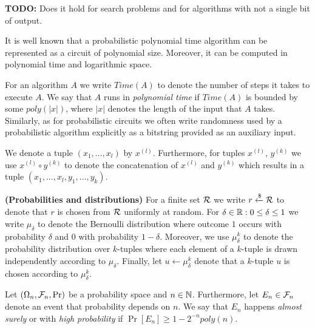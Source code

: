 \begin{todo}
  \textbf{TODO:} Does it hold for search problems and for algorithms with not a single bit of output.
\end{todo}
It is well known \cite{Arora:2009:CCM:1540612} that a probabilistic polynomial time algorithm can be represented as a circuit of polynomial size.
Moreover, it can be computed in polynomial time and logarithmic space.

For an algorithm $A$ we write $\mathit{Time}(A)$ to denote the number of steps it takes to execute $A$.
We say that $A$ runs in \textit{polynomial time} if $\mathit{Time}(A)$ is bounded by some $poly(|x|)$, where $|x|$ denotes the length of the input that $A$ takes.
Similarly, as for probabilistic circuits we often write randomness used by a probabilistic algorithm explicitly as a bitstring provided as an auxiliary input.

We denote a tuple $(x_1, \dotsc, x_l)$ by $x^{(l)}$.
Furthermore, for tuples $x^{(l)}$, $y^{(k)}$ we use $x^{(l)} \circ y^{(k)}$ to denote the concatenation of $x^{(l)}$ and $y^{(k)}$ which results in
a tuple $(x_1, \dotsc, x_l, y_1, \dotsc, y_k)$.

\textbf{(Probabilities and distributions)}
For a finite set $\mathcal{R}$ we write $r \xleftarrow{\$} \mathcal{R}$ to denote that $r$ is chosen from $\mathcal{R}$ uniformly at random.
For $\delta \in \mathbb{R} : 0 \leq \delta \leq 1$ we write $\mu_{\delta}$ to denote the Bernoulli distribution where outcome $1$ occurs with
probability $\delta$ and $0$ with probability $1-\delta$.
Moreover, we use $\mu_{\delta}^k$ to denote the probability distribution over $k$-tuples
where each element of a $k$-tuple is drawn independently according to $\mu_{\delta}$.
Finally, let $u \leftarrow \mu_{\delta}^k$ denote that a $k$-tuple $u$ is chosen according to $\mu_{\delta}^k$.

Let $(\Omega_n, \mathcal{F}_n, \Pr)$ be a probability space and $n \in \mathbb{N}$.
Furthermore, let $E_n \in \mathcal{F}_n$ denote an event that probability depends on $n$.
We say that $E_n$ happens \textit{almost surely} or with \textit{high probability} if $\Pr[E_n] \geq 1 - 2^{-n} \mathit{poly}(n)$.

